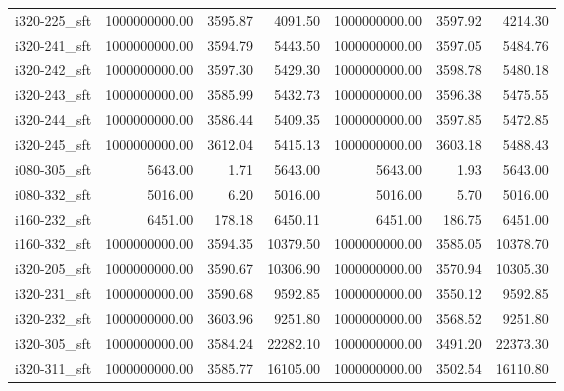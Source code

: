 \begin{tabular}{lrrrrrr}
i320-225\_sft &      1000000000.00 &                3595.87 &          4091.50 &    1000000000.00 &              3597.92 &        4214.30 \\
i320-241\_sft &      1000000000.00 &                3594.79 &          5443.50 &    1000000000.00 &              3597.05 &        5484.76 \\
i320-242\_sft &      1000000000.00 &                3597.30 &          5429.30 &    1000000000.00 &              3598.78 &        5480.18 \\
i320-243\_sft &      1000000000.00 &                3585.99 &          5432.73 &    1000000000.00 &              3596.38 &        5475.55 \\
i320-244\_sft &      1000000000.00 &                3586.44 &          5409.35 &    1000000000.00 &              3597.85 &        5472.85 \\
i320-245\_sft &      1000000000.00 &                3612.04 &          5415.13 &    1000000000.00 &              3603.18 &        5488.43 \\
i080-305\_sft &            5643.00 &                   1.71 &          5643.00 &          5643.00 &                 1.93 &        5643.00 \\
i080-332\_sft &            5016.00 &                   6.20 &          5016.00 &          5016.00 &                 5.70 &        5016.00 \\
i160-232\_sft &            6451.00 &                 178.18 &          6450.11 &          6451.00 &               186.75 &        6451.00 \\
i160-332\_sft &      1000000000.00 &                3594.35 &         10379.50 &    1000000000.00 &              3585.05 &       10378.70 \\
i320-205\_sft &      1000000000.00 &                3590.67 &         10306.90 &    1000000000.00 &              3570.94 &       10305.30 \\
i320-231\_sft &      1000000000.00 &                3590.68 &          9592.85 &    1000000000.00 &              3550.12 &        9592.85 \\
i320-232\_sft &      1000000000.00 &                3603.96 &          9251.80 &    1000000000.00 &              3568.52 &        9251.80 \\
i320-305\_sft &      1000000000.00 &                3584.24 &         22282.10 &    1000000000.00 &              3491.20 &       22373.30 \\
i320-311\_sft &      1000000000.00 &                3585.77 &         16105.00 &    1000000000.00 &              3502.54 &       16110.80 \\

\end{tabular}
